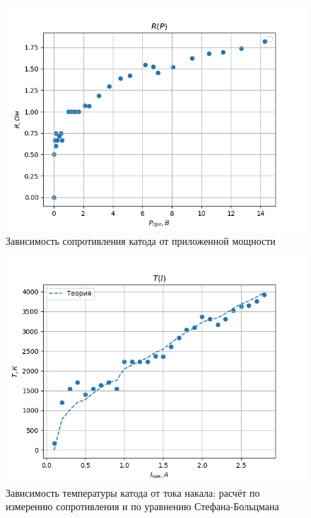 \documentclass[a4paper]{article}
\begin{document}
\begin{figure}[h]
\begin{center}
\includegraphics[width=13cm]{./Diode/fig2.PNG}
\caption{Зависимость сопротивления катода от приложенной мощности}
\label{ris:experimoriginal} %
\end{center}
\end{figure}

\begin{figure}[h]
\begin{center}
\includegraphics[width=13cm]{./Diode/fig3.PNG}
\caption{Зависимость температуры катода от тока накала: расчёт по измерению сопротивления и по уравнению Стефана-Больцмана}
\label{ris:experimoriginal} %
\end{center}
\end{figure}
\end{document}
